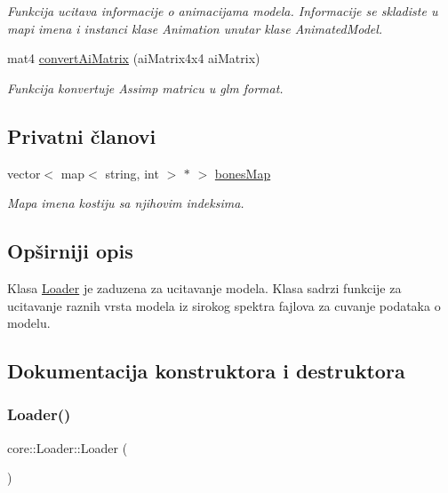 \begin{DoxyCompactItemize}
\begin{DoxyCompactList}\small\item\em Funkcija ucitava informacije o animacijama modela. Informacije se skladiste u mapi imena i instanci klase Animation unutar klase Animated\+Model. \end{DoxyCompactList}\item 
mat4 \hyperlink{classcore_1_1Loader_a4d635316740767d7aaebc7bf0c52ebe2}{convert\+Ai\+Matrix} (ai\+Matrix4x4 ai\+Matrix)
\begin{DoxyCompactList}\small\item\em Funkcija konvertuje Assimp matricu u glm format. \end{DoxyCompactList}\end{DoxyCompactItemize}
\subsection*{Privatni članovi}
\begin{DoxyCompactItemize}
\item 
vector$<$ map$<$ string, int $>$ $\ast$ $>$ \hyperlink{classcore_1_1Loader_a86ae8bc5968de3aa3c7450acadfb6fea}{bones\+Map}
\begin{DoxyCompactList}\small\item\em Mapa imena kostiju sa njihovim indeksima. \end{DoxyCompactList}\end{DoxyCompactItemize}


\subsection{Opširniji opis}
Klasa \hyperlink{classcore_1_1Loader}{Loader} je zaduzena za ucitavanje modela. Klasa sadrzi funkcije za ucitavanje raznih vrsta modela iz sirokog spektra fajlova za cuvanje podataka o modelu. 

\subsection{Dokumentacija konstruktora i destruktora}
\mbox{\label{classcore_1_1Loader_a8fc16cee7fd1812e40b1e78aa2568535}} 
\subsubsection{\texorpdfstring{Loader()}{Loader()}}
{\footnotesize\ttfamily core\+::\+Loader\+::\+Loader (\begin{DoxyParamCaption}{ }\end{DoxyParamCaption})}



